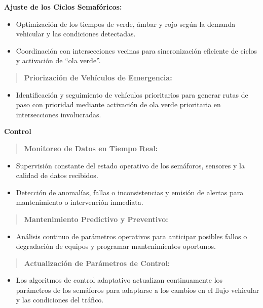 \documentclass[12pt,a4paper,oneside]{report}
\begin{document}
\textbf{Ajuste de los Ciclos Semafóricos:}

\begin{itemize}
\item
  Optimización de los tiempos de verde, ámbar y rojo según la demanda vehicular y las condiciones detectadas.
\item
  Coordinación con intersecciones vecinas para sincronización eficiente de ciclos y activación de ``ola verde''.
\end{itemize}

\begin{quote}
\textbf{Priorización de Vehículos de Emergencia:}
\end{quote}

\begin{itemize}
\item
  Identificación y seguimiento de vehículos prioritarios para generar rutas de paso con prioridad mediante activación de ola verde prioritaria en intersecciones involucradas.
\end{itemize}

\textbf{Control}

\begin{quote}
\textbf{Monitoreo de Datos en Tiempo Real:}
\end{quote}

\begin{itemize}
\item
  Supervisión constante del estado operativo de los semáforos, sensores y la calidad de datos recibidos.
\item
  Detección de anomalías, fallas o inconsistencias y emisión de alertas para mantenimiento o intervención inmediata.
\end{itemize}

\begin{quote}
\textbf{Mantenimiento Predictivo y Preventivo:}
\end{quote}

\begin{itemize}
\item
  Análisis continuo de parámetros operativos para anticipar posibles fallos o degradación de equipos y programar mantenimientos oportunos.
\end{itemize}

\begin{quote}
\textbf{Actualización de Parámetros de Control:}
\end{quote}

\begin{itemize}
\item
  Los algoritmos de control adaptativo actualizan continuamente los parámetros de los semáforos para adaptarse a los cambios en el flujo vehicular y las condiciones del tráfico.
\end{itemize}
\end{document}
